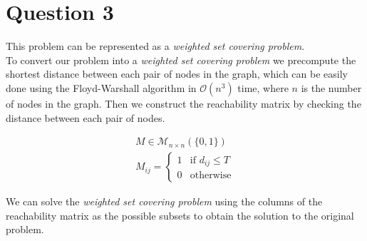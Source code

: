 \section{Question 3}

This problem can be represented as a \textit{weighted set covering problem}.  \\

To convert our problem into a \textit{weighted set covering problem} we precompute the shortest distance between each pair of nodes in the graph, which can be easily done using the Floyd-Warshall algorithm in $\mathcal{O}(n^3)$ time, where $n$ is the number of nodes in the graph.
Then we construct the reachability matrix by checking the distance between each pair of nodes.

\begin{align*}
	M \in \mathcal{M}_{n \times n} (\{0, 1\})  \\
	M_{ij} = \begin{cases}
		1 & \text{if } d_{ij} \leq T \\
		0 & \text{otherwise}
	\end{cases}
\end{align*}

We can solve the \textit{weighted set covering problem} using the columns of the reachability matrix as the possible subsets to obtain the solution to the original problem.
